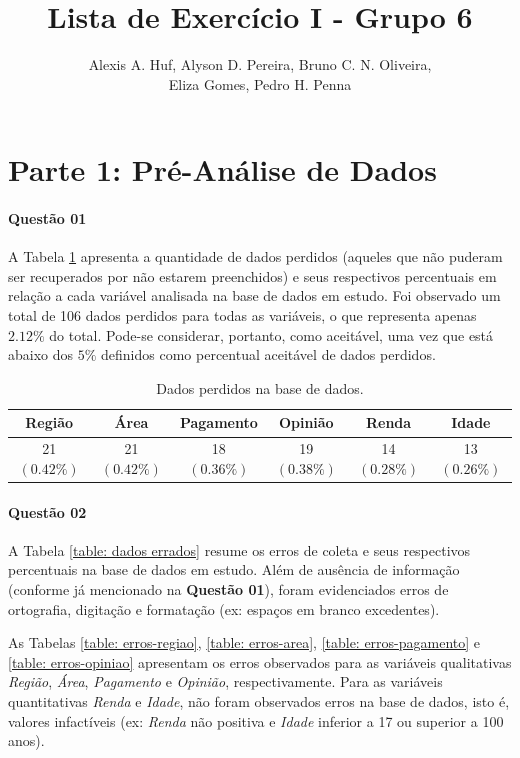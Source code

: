 \documentclass[10pt,a4paper,oneside]{article}
\author{%
	Alexis A. Huf, %
	Alyson D. Pereira, %
	Bruno C. N. Oliveira,\\%
	Eliza Gomes, %
	Pedro H. Penna
	}
\title{Lista de Exercício I - Grupo 6}
\begin{document}
\maketitle

\section*{Parte 1: Pré-Análise de Dados}

\paragraph{Questão 01}

A Tabela \ref{table: dados perdidos} apresenta a quantidade de dados perdidos (aqueles que não puderam ser recuperados por não estarem preenchidos) e seus respectivos percentuais em relação a cada variável analisada na base de dados em estudo. Foi observado um total de 106 dados perdidos para todas as variáveis, o que representa apenas $2.12\%$ do total. Pode-se considerar, portanto, como aceitável, uma vez que está abaixo dos $5\%$ definidos como percentual aceitável de dados perdidos.

\begin{table}[h]
\centering
\caption{Dados perdidos na base de dados.}
\label{table: dados perdidos}
\vspace{0.5em}
\begin{tabular}{c c c c c c}
	\toprule
	\textbf{Região} & \textbf{Área} & \textbf{Pagamento} & \textbf{Opinião} & \textbf{Renda} & \textbf{Idade} \\
	\midrule
	21 $(0.42\%)$   & 21 $(0.42\%)$ & 18 $(0.36\%)$      & 19 $(0.38\%)$    & 14 $(0.28\%)$  & 13 $(0.26\%)$ \\
	\bottomrule
\end{tabular}
\end{table}

%
%
\paragraph{Questão 02}

A Tabela \ref{table: dados errados} resume os erros de coleta e seus respectivos percentuais na base de dados em estudo. Além de ausência de informação (conforme já mencionado na \textbf{Questão 01}), foram evidenciados erros de ortografia, digitação e formatação (ex: espaços em branco excedentes). 

As Tabelas \ref{table: erros-regiao}, \ref{table: erros-area}, \ref{table: erros-pagamento} e \ref{table: erros-opiniao} apresentam os erros observados para as variáveis qualitativas \textit{Região}, \textit{Área}, \textit{Pagamento} e \textit{Opinião}, respectivamente.
Para as variáveis quantitativas \textit{Renda} e \textit{Idade}, não foram observados erros na base de dados, isto é, valores infactíveis (ex: \textit{Renda} não positiva e \textit{Idade} inferior a 17 ou superior a 100 anos).
\end{document}
